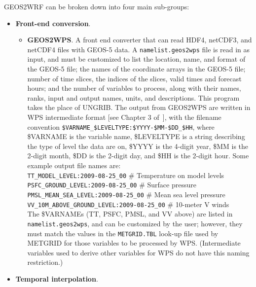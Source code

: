 GEOS2WRF can be broken down into four main sub-groups:

\begin{itemize}
\item \textbf{Front-end conversion}. 
  \begin{itemize}
  \item \textbf{GEOS2WPS}.  A front end converter that can read HDF4, netCDF3,
    and netCDF4 files with GEOS-5 data.  A \texttt{namelist.geos2wps} file is
    read in as input, and must be customized to list the location, name, and 
    format of the GEOS-5 file; the names of the coordinate arrays in the GEOS-5
    file; number of time slices, the indices of the slices, valid times and 
    forecast hours; and the number of variables to process, along with their 
    names, ranks, input and output names, units, and descriptions.  This 
    program takes the place of UNGRIB.  The output from GEOS2WPS are written 
    in WPS intermediate format [see Chapter 3 of~\cite{ref:ArwUserGuide}], 
    with the filename convention 
    \texttt{\$VARNAME\_\$LEVELTYPE:\$YYYY-\$MM-\$DD\_\$HH}, where \$VARNAME is
    the variable name, \$LEVELTYPE is a string describing the type of level 
    the data are on, \$YYYY is the 4-digit year, \$MM is the 2-digit month, 
    \$DD is the 2-digit day, and \$HH is the 2-digit hour.  Some example 
    output file names are:\\


    \texttt{TT\_MODEL\_LEVEL:2009-08-25\_00}              \# Temperature on model levels \\
    \texttt{PSFC\_GROUND\_LEVEL:2009-08-25\_00}           \# Surface pressure \\
    \texttt{PMSL\_MEAN\_SEA\_LEVEL:2009-08-25\_00}        \# Mean sea level pressure \\
    \texttt{VV\_10M\_ABOVE\_GROUND\_LEVEL:2009-08-25\_00} \# 10-meter V winds \\

    The \$VARNAMEs (TT, PSFC, PMSL, and VV above) are listed in 
    \texttt{namelist.geos2wps}, and can be customized by the user; however, 
    they must match the values in the \texttt{METGRID.TBL} look-up file used 
    by METGRID for those variables to be processed by WPS.  (Intermediate 
    variables used to derive other variables for WPS do not have this naming 
    restriction.)
  \end{itemize}

\item \textbf{Temporal interpolation}. 


\end{itemize}
